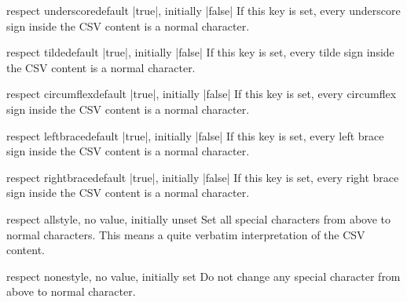 \documentclass[a4paper,11pt]{ltxdoc}
\begin{document}
\begin{docCsvKey}{respect underscore}{}{default |true|, initially |false|}
  If this key is set, every
  underscore sign \verbbox{\_}
  inside the CSV content is a normal character.
\end{docCsvKey}

\begin{docCsvKey}{respect tilde}{}{default |true|, initially |false|}
  If this key is set, every
  tilde sign \verbbox{\textasciitilde}
  inside the CSV content is a normal character.
\end{docCsvKey}

\begin{docCsvKey}{respect circumflex}{}{default |true|, initially |false|}
  If this key is set, every
  circumflex sign \verbbox{\textasciicircum}
  inside the CSV content is a normal character.
\end{docCsvKey}

\begin{docCsvKey}{respect leftbrace}{}{default |true|, initially |false|}
  If this key is set, every
  left brace sign \verbbox{\textbraceleft}
  inside the CSV content is a normal character.
\end{docCsvKey}

\begin{docCsvKey}{respect rightbrace}{}{default |true|, initially |false|}
  If this key is set, every
  right brace sign \verbbox{\textbraceright}
  inside the CSV content is a normal character.
\end{docCsvKey}

\begin{docCsvKey}{respect all}{}{style, no value, initially unset}
  Set all special characters from above to normal characters. This means
  a quite verbatim interpretation of the CSV content.
\end{docCsvKey}

\begin{docCsvKey}{respect none}{}{style, no value, initially set}
  Do not change any special character from above to normal character.
\end{docCsvKey}

\clearpage
\end{document}

